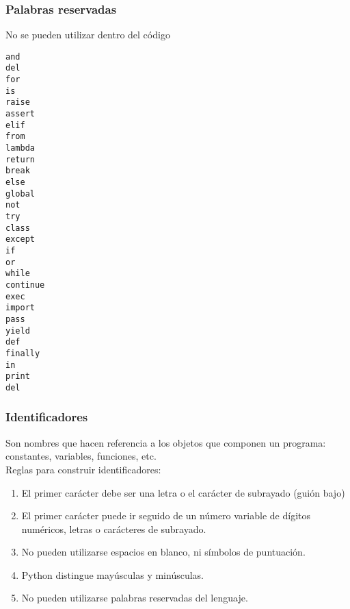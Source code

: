 \documentclass[12pt]{beamer}
\begin{document}
\begin{frame}
\frametitle{Palabras reservadas}
No se pueden utilizar dentro del c\'{o}digo
\fontsize{12}{12}\selectfont
\begin{multicols}{6}
\texttt{and \\
del \\
for \\
is \\
raise \\
assert \\
elif \\
from \\
lambda \\
return \\
break \\
else \\
global \\
not \\
try \\
class \\
except \\
if \\
or \\ 
while \\
continue \\
exec \\
import \\
pass \\
yield \\
def \\
finally \\
in \\
print \\
del 
}
\end{multicols}
\end{frame}
\begin{frame}
\frametitle{Identificadores}
Son nombres que hacen referencia a los objetos que componen un programa: constantes, variables, funciones, etc.
\\
\bigskip
Reglas para construir identificadores:
\begin{enumerate}
\item El primer car\'{a}cter debe ser una letra o el car\'{a}cter de subrayado (gui\'{o}n bajo)
\item El primer car\'{a}cter puede ir seguido de un n\'{u}mero variable de d\'{i}gitos num\'{e}ricos, letras o car\'{a}cteres de subrayado.
\item No pueden utilizarse espacios en blanco, ni s\'{i}mbolos de puntuaci\'{o}n.
\item Python distingue may\'{u}sculas y min\'{u}sculas.
\item No pueden utilizarse palabras reservadas del lenguaje.
\end{enumerate}
\end{frame}
\end{document}
